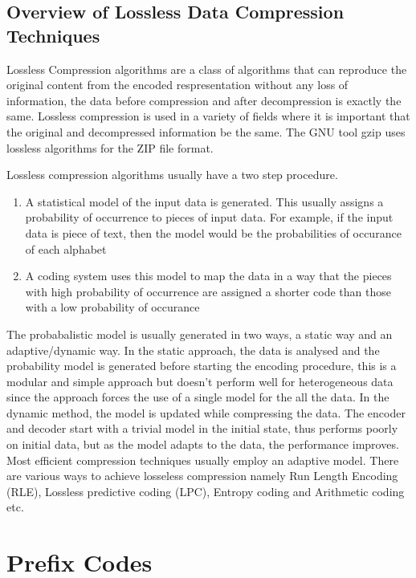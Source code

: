 \documentclass{article}
\begin{document}
\subsection{Overview of Lossless Data Compression Techniques}

Lossless Compression algorithms are a class of algorithms that can reproduce the original content from the encoded respresentation without any loss of information, the data before compression and after decompression is exactly the same. Lossless compression is used in a variety of fields where it is important that the original and decompressed information be the same. The GNU tool gzip uses lossless algorithms for the ZIP file format.

Lossless compression algorithms usually have a two step procedure. 
\begin{enumerate}
	\item A statistical model of the input data is generated. This usually assigns a probability of occurrence to pieces of input data. For example, if the input data is piece of text, then the model would be the probabilities of occurance of each alphabet
	
	\item A coding system uses this model to map the data in a way that the pieces with high probability of occurrence are assigned a shorter code than those with a low probability of occurance
\end{enumerate}

The probabalistic model is usually generated in two ways, a static way and an adaptive/dynamic way. In the static approach, the data is analysed and the probability model is generated before starting the encoding procedure, this is a modular and simple approach but doesn't perform well for heterogeneous data since the approach forces the use of a single model for the all the data. In the dynamic method, the model is updated while compressing the data. The encoder and decoder start with a trivial model in the initial state, thus performs poorly on initial data, but as the model adapts to the data, the performance improves. Most efficient compression techniques usually employ an adaptive model. There are various ways to achieve losseless compression namely Run Length Encoding (RLE), Lossless predictive coding (LPC), Entropy coding and Arithmetic coding etc.\cite{parekar2014lossless}\cite{yellamma2012performance}

\section{Prefix Codes}
\lipsum[1]
	
\end{document}

